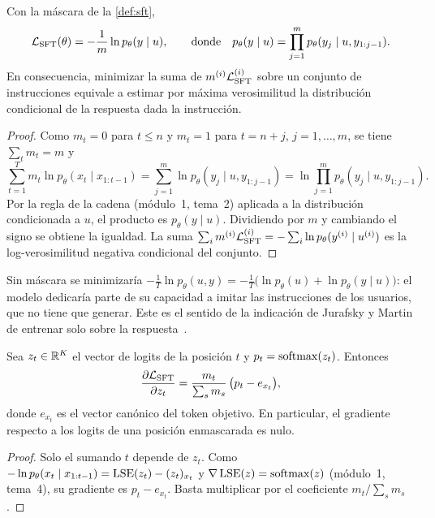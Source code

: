\begin{proposicion}\label{prop:sft-condicional}
Con la máscara de la \cref{def:sft},
\[
\mathcal{L}_{\mathrm{SFT}}(\theta)=-\frac{1}{m}\ln p_\theta(y\mid u),\qquad\text{donde}\quad p_\theta(y\mid u)=\prod_{j=1}^{m}p_\theta(y_j\mid u,y_{1:j-1}).
\]
En consecuencia, minimizar la suma de $m^{(i)}\mathcal{L}_{\mathrm{SFT}}^{(i)}$ sobre un conjunto de instrucciones equivale a estimar por máxima verosimilitud la distribución condicional de la respuesta dada la instrucción.
\end{proposicion}

\begin{proof}
Como $m_t=0$ para $t\le n$ y $m_t=1$ para $t=n+j$, $j=1,\dots,m$, se tiene $\sum_t m_t=m$ y
\[
\sum_{t=1}^{T}m_t\ln p_\theta(x_t\mid x_{1:t-1})=\sum_{j=1}^{m}\ln p_\theta(y_j\mid u,y_{1:j-1})=\ln\prod_{j=1}^{m}p_\theta(y_j\mid u,y_{1:j-1}).
\]
Por la regla de la cadena (módulo~1, tema~2) aplicada a la distribución condicionada a $u$, el producto es $p_\theta(y\mid u)$. Dividiendo por $m$ y cambiando el signo se obtiene la igualdad. La suma $\sum_i m^{(i)}\mathcal{L}_{\mathrm{SFT}}^{(i)}=-\sum_i\ln p_\theta(y^{(i)}\mid u^{(i)})$ es la log-verosimilitud negativa condicional del conjunto.
\end{proof}

\begin{observacion}
Sin máscara se minimizaría $-\frac{1}{T}\ln p_\theta(u,y)=-\frac1T\bigl(\ln p_\theta(u)+\ln p_\theta(y\mid u)\bigr)$: el modelo dedicaría parte de su capacidad a imitar las instrucciones de los usuarios, que no tiene que generar. Este es el sentido de la indicación de Jurafsky y Martin de entrenar solo sobre la respuesta~\cite[§8.1]{jm3}.
\end{observacion}

\begin{proposicion}\label{prop:grad-mascara}
Sea $z_t\in\mathbb{R}^{K}$ el vector de logits de la posición $t$ y $p_t=\operatorname{softmax}(z_t)$. Entonces
\[
\frac{\partial\mathcal{L}_{\mathrm{SFT}}}{\partial z_t}=\frac{m_t}{\sum_{s}m_s}\,\bigl(p_t-e_{x_t}\bigr),
\]
donde $e_{x_t}$ es el vector canónico del token objetivo. En particular, el gradiente respecto a los logits de una posición enmascarada es nulo.
\end{proposicion}

\begin{proof}
Solo el sumando $t$ depende de $z_t$. Como $-\ln p_\theta(x_t\mid x_{1:t-1})=\operatorname{LSE}(z_t)-(z_t)_{x_t}$ y $\nabla\operatorname{LSE}(z)=\operatorname{softmax}(z)$ (módulo~1, tema~4), su gradiente es $p_t-e_{x_t}$. Basta multiplicar por el coeficiente $m_t/\sum_s m_s$.
\end{proof}

